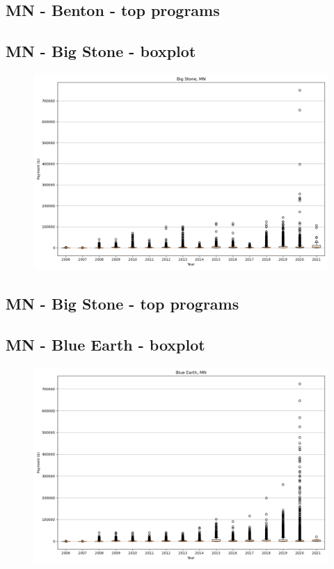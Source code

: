 \subsection*{MN - Benton - top programs}

\newpage
\subsection*{MN - Big Stone - boxplot}
\begin{figure}[h]
\centering
\includegraphics[width=7in]{../output/boxplots/counties/Big Stone-MN_boxplot.png}
\end{figure}


\subsection*{MN - Big Stone - top programs}

\newpage
\subsection*{MN - Blue Earth - boxplot}
\begin{figure}[h]
\centering
\includegraphics[width=7in]{../output/boxplots/counties/Blue Earth-MN_boxplot.png}
\end{figure}


